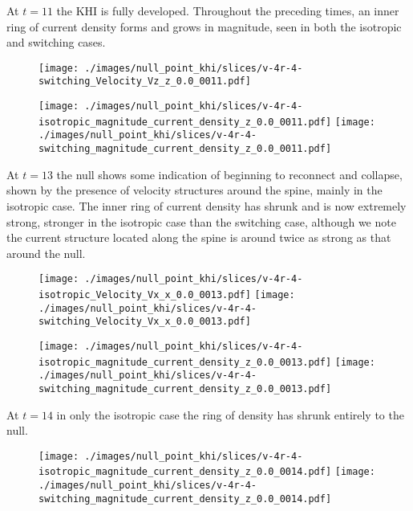 At $t=11$ the KHI is fully developed. Throughout the preceding times, an inner ring of current density forms and grows in magnitude, seen in both the isotropic and switching cases.

\begin{figure}[H]
  \centering
  \texttt{[image: ./images/null\_point\_khi/slices/v-4r-4-switching\_Velocity\_Vz\_z\_0.0\_0011.pdf]}
\end{figure}

\begin{figure}[H]
  \centering
  \texttt{[image: ./images/null\_point\_khi/slices/v-4r-4-isotropic\_magnitude\_current\_density\_z\_0.0\_0011.pdf]}
  \texttt{[image: ./images/null\_point\_khi/slices/v-4r-4-switching\_magnitude\_current\_density\_z\_0.0\_0011.pdf]}
\end{figure}

At $t=13$ the null shows some indication of beginning to reconnect and collapse, shown by the presence of velocity structures around the spine, mainly in the isotropic case. The inner ring of current density has shrunk and is now extremely strong, stronger in the isotropic case than the switching case, although we note the current structure located along the spine is around twice as strong as that around the null.

\begin{figure}[H]
  \centering
  \texttt{[image: ./images/null\_point\_khi/slices/v-4r-4-isotropic\_Velocity\_Vx\_x\_0.0\_0013.pdf]}
  \texttt{[image: ./images/null\_point\_khi/slices/v-4r-4-switching\_Velocity\_Vx\_x\_0.0\_0013.pdf]}
\end{figure}

\begin{figure}[H]
  \centering
  \texttt{[image: ./images/null\_point\_khi/slices/v-4r-4-isotropic\_magnitude\_current\_density\_z\_0.0\_0013.pdf]}
  \texttt{[image: ./images/null\_point\_khi/slices/v-4r-4-switching\_magnitude\_current\_density\_z\_0.0\_0013.pdf]}
\end{figure}

At $t=14$ in only the isotropic case the ring of density has shrunk entirely to the null.

\begin{figure}[H]
  \centering
  \texttt{[image: ./images/null\_point\_khi/slices/v-4r-4-isotropic\_magnitude\_current\_density\_z\_0.0\_0014.pdf]}
  \texttt{[image: ./images/null\_point\_khi/slices/v-4r-4-switching\_magnitude\_current\_density\_z\_0.0\_0014.pdf]}
\end{figure}

